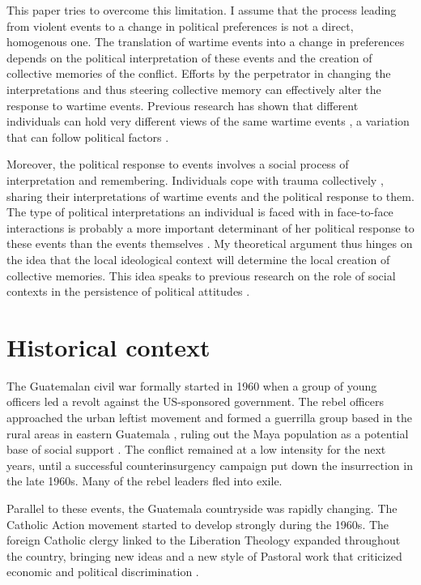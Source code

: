 \documentclass[12pt, notitlepage]{article}
\begin{document}
This paper tries to overcome this limitation.
I assume that the process leading from violent events to a change in political preferences is not a direct, homogenous one.
The translation of wartime events into a change in preferences depends on the political interpretation of these events and the creation of collective memories of the conflict.
Efforts by the perpetrator in changing the interpretations and thus steering collective memory can effectively alter the response to wartime events.
Previous research has shown that different individuals can hold very different views of the same wartime events \citep{Driscoll:2016aa}, a variation that can follow political factors \citep{Silverman:2019aa}.

Moreover, the political response to events involves a social process of interpretation and remembering.
Individuals cope with trauma collectively \citep{Lyons:1998aa}, sharing their interpretations of wartime events and the political response to them.
The type of political interpretations an individual is faced with in face-to-face interactions is probably a more important determinant of her political response to these events than the events themselves \citep{Dyrstad:2012aa, Molina:2014aa, Glaurdic:2016aa}.
My theoretical argument thus hinges on the idea that the local ideological context will determine the local creation of collective memories.
This idea speaks to previous research on the role of social contexts in the persistence of political attitudes \citep{Wittenberg:2006aa, Tavits:2013aa}.

\section*{Historical context}

The Guatemalan civil war formally started in 1960 when a group of young officers led a revolt against the US-sponsored government.
The rebel officers approached the urban leftist movement and formed a guerrilla group based in the rural areas in eastern Guatemala \citep{Arias:1992aa}, ruling out the Maya population as a potential base of social support \citep{Smith:1990ab}.
The conflict remained at a low intensity for the next years, until a successful counterinsurgency campaign put down the insurrection in the late 1960s.
Many of the rebel leaders fled into exile.

Parallel to these events, the Guatemala countryside was rapidly changing.
The Catholic Action movement started to develop strongly during the 1960s.
The foreign Catholic clergy linked to the Liberation Theology expanded throughout the country, bringing new ideas and a new style of Pastoral work that criticized economic and political discrimination \citep{Arias:1992aa, Nelson:2009aa, Stoll:1999aa}.
\end{document}
